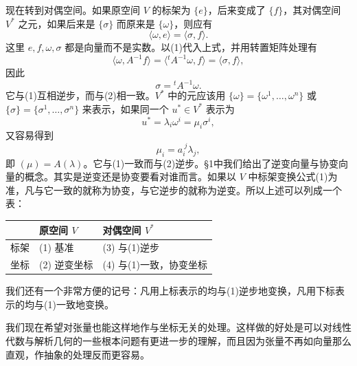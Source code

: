 现在转到对偶空间。如果原空间 $V$ 的标架为 $\{e\}$，后来变成了 $\{f\}$，其对偶空间 $V^*$ 之元，如果后来是 $\{\sigma\}$ 而原来是 $\{\omega\}$，则应有
\[
 \langle\omega,e\rangle=\langle\sigma,f\rangle.
\]
这里 $e,f,\omega,\sigma$ 都是向量而不是实数。以(1)代入上式，并用转置矩阵处理有
\[
 \langle\omega,A^{-1}f\rangle=\langle{}^tA^{-1}\omega,f\rangle=\langle\sigma,f\rangle,
\]
因此
\begin{equation}
 \sigma={}^tA^{-1}\omega.
 \tag{3}
\end{equation}
它与(1)互相逆步，而与(2)相一致。$V^*$ 中的元应该用 $\{\omega\}=\{\omega^1,\ldots,\omega^n\}$ 或 $\{\sigma\}=\{\sigma^1,\ldots,\sigma^n\}$ 来表示，如果同一个 $u^*\in V^*$ 表示为
\[
 u^*=\lambda_i\omega^i=\mu_i\sigma^i,
\]
又容易得到
\begin{equation}
 \mu_i=a_i^{\ j}\lambda_j,
 \tag{4}
\end{equation}
即 $(\mu)=A(\lambda)$。它与(1)一致而与(2)逆步。§1中我们给出了逆变向量与协变向量的概念。其实是逆变还是协变要看对谁而言。如果以 $V$ 中标架变换公式(1)为准，凡与它一致的就称为协变，与它逆步的就称为逆变。所以上述可以列成一个表：

\begin{center}
\begin{tabular}{>{\centering\arraybackslash}p{}|>{\centering\arraybackslash}p{}|>{\centering\arraybackslash}p{}}
\toprule
 & 原空间 $V$ & 对偶空间 $V^*$ \\
\midrule
标架 & (1) 基准 & (3) 与(1)逆步 \\
坐标 & (2) 逆变坐标 & (4) 与(1)一致，协变坐标 \\
\bottomrule
\end{tabular}
\end{center}

我们还有一个非常方便的记号：凡用上标表示的均与(1)逆步地变换，凡用下标表示的均与(1)一致地变换。

我们现在希望对张量也能这样地作与坐标无关的处理。这样做的好处是可以对线性代数与解析几何的一些根本问题有更进一步的理解，而且因为张量不再如向量那么直观，作抽象的处理反而更容易。

